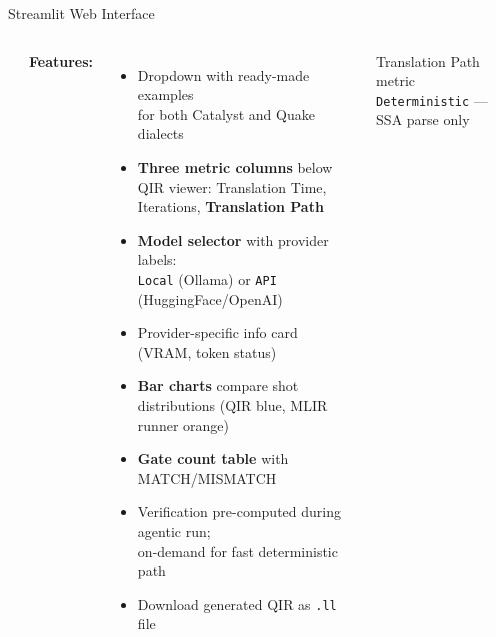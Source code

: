 \documentclass[aspectratio=169,10pt]{beamer}
\newcommand{\hlg}[1]{\textcolor{qirgreen}{\textbf{#1}}}
\newcommand{\hlo}[1]{\textcolor{ssaorange}{\textbf{#1}}}
\begin{document}
\begin{frame}[t]{Streamlit Web Interface}
\begin{columns}[T]
\begin{center}
      \end{center}
      \textbf{Features:}
      \vspace{4pt}
      \begin{itemize}\small
        \item Dropdown with ready-made examples\\
              for both Catalyst and Quake dialects
        \item \textbf{Three metric columns} below QIR viewer:
              Translation Time, Iterations,
              \hlo{Translation Path}
        \item \textbf{Model selector} with provider labels:\\
              \faLaptop\thinspace\texttt{Local} (Ollama) or
              \faCloud\thinspace\texttt{API} (HuggingFace/OpenAI)
        \item Provider-specific info card (VRAM, token status)
        \item \textbf{Bar charts} compare shot distributions
          (QIR blue, MLIR runner orange)
        \item \textbf{Gate count table} with MATCH/MISMATCH
        \item Verification pre-computed during agentic run;\\
              on-demand for fast deterministic path
        \item Download generated QIR as \texttt{.ll} file
      \end{itemize}
      \vspace{4pt}
      \begin{block}{\small Translation Path metric}
        \scriptsize
        \texttt{Deterministic} --- SSA parse only\\

\end{block}
\end{columns}
\end{frame}
\end{document}
